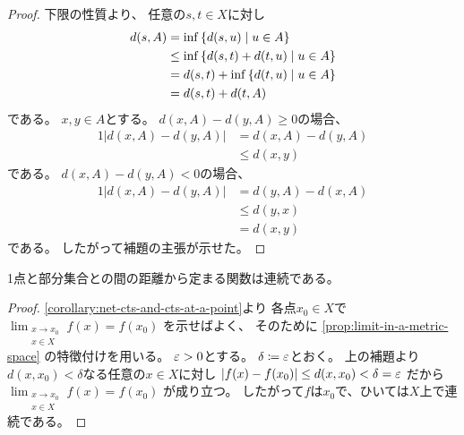 \documentclass[report]{jlreq}
\begin{document}

\begin{proof}
    下限の性質より、
    任意の$s, t \in X$に対し
    \begin{alignat}{1}
        d(s, A)
            &= \inf \left\{{
                d(s, u) \mid u \in A
            }\right\} \\
            &\le \inf \left\{{
                d(s, t) + d(t, u) \mid u \in A
            }\right\} \\
            &= d(s, t) + \inf \left\{{
                d(t, u) \mid u \in A
            }\right\} \\
            &= d(s, t) + d(t, A)
    \end{alignat}
    である。
    $x, y \in A$とする。
    $d(x, A) - d(y, A) \ge 0$の場合、
    \begin{alignat}{1}
        |d(x, A) - d(y, A)|
            &= d(x, A) - d(y, A) \\
            &\le d(x, y)
    \end{alignat}
    である。
    $d(x, A) - d(y, A) < 0$の場合、
    \begin{alignat}{1}
        |d(x, A) - d(y, A)|
            &= d(y, A) - d(x, A) \\
            &\le d(y, x) \\
            &= d(x, y)
    \end{alignat}
    である。
    したがって補題の主張が示せた。
\end{proof}

1点と部分集合との間の距離から定まる関数は連続である。


\begin{proof}
    \cref{corollary:net-cts-and-cts-at-a-point}より
    各点$x_0 \in X$で
    $\lim_{\substack{x \to x_0 \\ x \in X}} f(x) = f(x_0)$
    を示せばよく、
    そのために
    \cref{prop:limit-in-a-metric-space}
    の特徴付けを用いる。
    $\varepsilon > 0$とする。
    $\delta \coloneqq \varepsilon$とおく。
    上の補題より
    $d(x, x_0) < \delta$なる任意の$x \in X$に対し
    $|f(x) - f(x_0)| \le d(x, x_0) < \delta = \varepsilon$
    だから
    $\lim_{\substack{x \to x_0 \\ x \in X}} f(x) = f(x_0)$
    が成り立つ。
    したがって$f$は$x_0$で、ひいては$X$上で連続である。
\end{proof}
\end{document}
